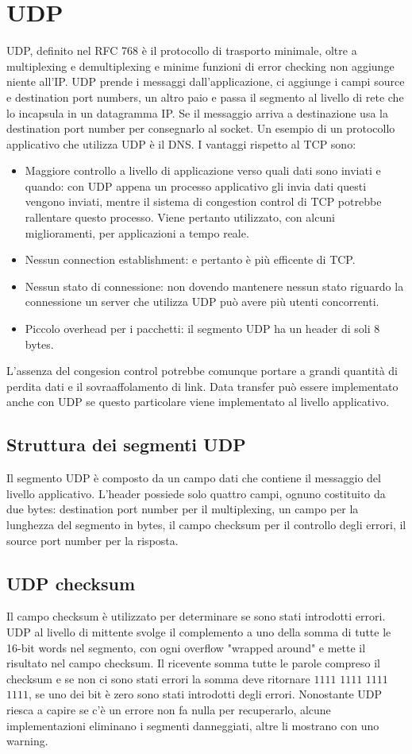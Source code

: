 \section{UDP}
UDP, definito nel RFC 768 \`e il protocollo di trasporto minimale, oltre a multiplexing e demultiplexing e minime funzioni di error checking non aggiunge 
niente all'IP. UDP prende i messaggi dall'applicazione, ci aggiunge i campi source e destination port numbers, un altro paio e passa il segmento 
al livello di rete che lo incapsula in un datagramma IP. Se il messaggio arriva a destinazione usa la destination port number per consegnarlo al socket. 
Un esempio di un protocollo applicativo che utilizza UDP \`e il DNS. I vantaggi rispetto al TCP sono:
\begin{itemize}
\item Maggiore controllo a livello di applicazione verso quali dati sono inviati e quando: con UDP appena un processo applicativo gli invia dati questi
vengono inviati, mentre il sistema di congestion control di TCP potrebbe rallentare questo processo. Viene pertanto utilizzato, con alcuni miglioramenti, 
per applicazioni a tempo reale.
\item Nessun connection establishment: e pertanto \`e pi\`u efficente di TCP.
\item Nessun stato di connessione: non dovendo mantenere nessun stato riguardo la connessione un server che utilizza UDP pu\`o avere pi\`u utenti 
concorrenti.
\item Piccolo overhead per i pacchetti: il segmento UDP ha un header di soli 8 bytes. 
\end{itemize}
L'assenza del congesion control potrebbe comunque portare a grandi quantit\`a di perdita dati e il sovraaffolamento di link. Data transfer pu\`o essere 
implementato anche con UDP se questo particolare viene implementato al livello applicativo. 
\subsection{Struttura dei segmenti UDP}
Il segmento UDP \`e composto da un campo dati che contiene il messaggio del livello applicativo. L'header possiede solo quattro campi, ognuno costituito da
due bytes: destination port number per il multiplexing, un campo per la lunghezza del segmento in bytes, il campo checksum per il controllo degli errori, il
source port number per la risposta.
\subsection{UDP checksum}
Il campo checksum \`e utilizzato per determinare se sono stati introdotti errori. UDP al livello di mittente svolge il complemento a uno della somma di 
tutte le 16-bit words nel segmento, con ogni overflow "wrapped around" e mette il risultato nel campo checksum. Il ricevente somma tutte le parole compreso 
il checksum e se non ci sono stati errori la somma deve ritornare $1111$ $1111$ $1111$ $1111$, se uno dei bit \`e zero sono stati introdotti degli errori. 
Nonostante UDP riesca a capire se c'\`e un errore non fa nulla per recuperarlo, alcune implementazioni eliminano i segmenti danneggiati, altre li mostrano
con uno warning. 
